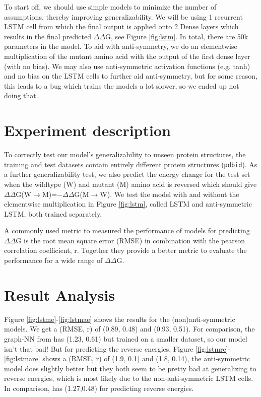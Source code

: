 \documentclass{article}
\newcommand{\dd}{$\Delta\Delta$}
\begin{document}
To start off, we should use simple models to minimize the number of assumptions, thereby improving generalizability. We will be using 1 recurrent LSTM cell from which the final output is applied onto 2 Dense layers which results in the final predicted $\Delta\Delta$G, see Figure \ref{fig:lstm}. In total, there are 50k parameters in the model. To aid with anti-symmetry, we do an elementwise multiplication of the mutant amino acid with the output of the first dense layer (with no bias). We may also use anti-symmetric activation functions (e.g. tanh) and no bias on the LSTM cells to further aid anti-symmetry, but for some reason, this leads to a bug which trains the models a lot slower, so we ended up not doing that.

\section{Experiment description}

To correctly test our model's generalizability to unseen protein structures, the training and test datasets contain entirely different protein structures (\texttt{pdbid}). As a further generalizability test, we also predict the energy change for the test set when the wildtype (W) and mutant (M) amino acid is reversed which should give \dd G(W$\rightarrow$M)=$-$\dd G(M$\rightarrow$W). We test the model with and without the elementwise multiplication in Figure \ref{fig:lstm}, called LSTM and anti-symmetric LSTM, both trained separately.

A commonly used metric to measured the performance of models for predicting \dd G is the root mean square error (RMSE) in combination with the pearson correlation coefficient, r. Together they provide a better metric to evaluate the performance for a wide range of \dd G.

\clearpage
\section{Result Analysis}

Figure \ref{fig:lstme}-\ref{fig:lstmae} shows the results for the (non)anti-symmetric models. We get a (RMSE, r) of (0.89, 0.48) and (0.93, 0.51). For comparison, the graph-NN from \citep{Wang2021} has (1.23, 0.61) but trained on a smaller dataset, so our model isn't that bad! But for predicting the reverse energies, Figure \ref{fig:lstmre}-\ref{fig:lstmare} shows a (RMSE, r) of (1.9, 0.1) and (1.8, 0.14), the anti-symmetric model does slightly better but they both seem to be pretty bad at generalizing to reverse energies, which is most likely due to the non-anti-symmetric LSTM cells. In comparison, \citep{Wang2021} has (1.27,0.48) for predicting reverse energies.
\end{document}
